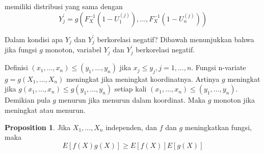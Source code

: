 \documentclass[a4paper,12pt]{article}
\theoremstyle{definition}
\newtheorem{prop}{Proposition}[section]
\begin{document}
memiliki distribusi yang sama dengan
\begin{equation}
    Y_{j}^{'}= g(F_{X}^{-1}(1-U_{1}^{(j)}),...,F_{X}^{-1}(1-U_{n}^{(j)}))
\end{equation}

Dalam kondisi apa $Y_{j}$ dan $Y_{j}^{{}'}$ berkorelasi negatif? Dibawah menunjukkan bahwa jika fungsi $g$ monoton, variabel $Y_{j}$ dan $Y_{j}^{{}'}$ berkorelasi negatif.

Definisi $(x_{1},...,x_{n})\leq (y_{1},...,y_{n})$ jika $x_{j}\leq y_{j},j= 1,...,n$. Fungsi n-variate $g= g(X_{1},...,X_{n})$ meningkat jika meningkat koordinatnya. Artinya $g$ meningkat jika $g(x_{1},...,x_{n})\leq g(y_{1},...,y_{n})$ setiap kali $(x_{1},...,x_{n})\leq (y_{1},...,y_{n})$. Demikian pula $g$ menurun jika menurun dalam koordinat. Maka $g$ monoton jika meningkat atau menurun.
\begin{prop}
    Jika $X_{1},...,X_{n}$ independen, dan $f$ dan $g$ meningkatkan fungsi, maka
    \begin{equation}
        E[f(X)g(X)]\geq E[f(X)]E[g(X)]
        \label{eqn:label3}
    \end{equation}
\end{prop}
\end{document}
